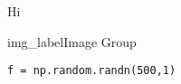 Hi

\begin{cvimggroup}{img_label}{Image Group}
\end{cvimggroup}

\begin{lstlisting}
f = np.random.randn(500,1)
\end{lstlisting}
